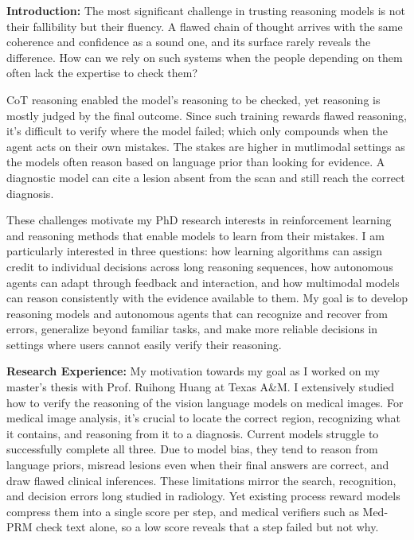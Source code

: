 \documentclass{article}
\begin{document}
\textbf{Introduction:} The most significant challenge in trusting reasoning models is not their fallibility but their fluency. A flawed chain of thought arrives with the same coherence and confidence as a sound one, and its surface rarely reveals the difference. How can we rely on such systems when the people depending on them often lack the expertise to check them?

CoT reasoning enabled the model's reasoning to be checked, yet reasoning is mostly judged by the final outcome. Since such training rewards flawed reasoning, it's difficult to verify where the model failed; which only compounds when the agent acts on their own mistakes. The stakes are higher in mutlimodal settings as the models often reason based on language prior than looking for evidence. A diagnostic model can cite a lesion absent from the scan and still reach the correct diagnosis.

These challenges motivate my PhD research interests in reinforcement learning and reasoning methods that enable models to learn from their mistakes. I am particularly interested in three questions: how learning algorithms can assign credit to individual decisions across long reasoning sequences, how autonomous agents can adapt through feedback and interaction, and how multimodal models can reason consistently with the evidence available to them. My goal is to develop reasoning models and autonomous agents that can recognize and recover from errors, generalize beyond familiar tasks, and make more reliable decisions in settings where users cannot easily verify their reasoning.





\textbf{Research Experience:} My motivation towards my goal as I worked on my master's thesis with Prof. Ruihong Huang at Texas A\&M. I extensively studied how to verify the reasoning of the vision language models on medical images. For medical image analysis, it's crucial to locate the correct region, recognizing what it contains, and reasoning from it to a diagnosis. Current models struggle to successfully complete all three. Due to model bias, they tend to reason from language priors, misread lesions even when their final answers are correct, and draw flawed clinical inferences. These limitations mirror the search, recognition, and decision errors long studied in radiology. Yet existing process reward models compress them into a single score per step, and medical verifiers such as Med-PRM check text alone, so a low score reveals that a step failed but not why.
\end{document}
